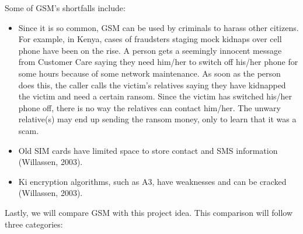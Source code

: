 \documentclass[12pt,svgnames,smaller]{article} %
\begin{document}
	Some of GSM’s shortfalls include:
	
	\begin{itemize}
		\item Since it is so common, GSM can be used by criminals to harass other citizens. For example, in Kenya, cases of fraudsters staging mock kidnaps over cell phone have been on the rise. A person gets a seemingly innocent message from Customer Care saying they need him/her to switch off his/her phone for some hours because of some network maintenance. As soon as the person does this, the caller calls the victim’s relatives saying they have kidnapped the victim and need a certain ransom. Since the victim has switched his/her phone off, there is no way the relatives can contact him/her. The unwary relative(s) may end up sending the ransom money, only to learn that it was a scam.
		\item Old SIM cards have limited space to store contact and SMS information (Willassen, 2003).
		\item Ki encryption algorithms, such as A3, have weaknesses and can be cracked (Willassen, 2003). 
	\end{itemize}
	
	Lastly, we will compare GSM with this project idea. This comparison will follow three categories: 
	
\end{document}
